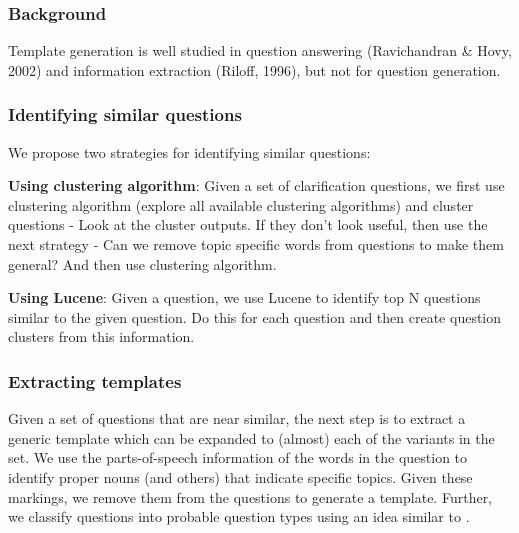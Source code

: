 \documentclass[11pt]{article}
\begin{document}
\subsubsection{Background}
 Template generation is well studied in question answering (Ravichandran \& Hovy, 2002) and information extraction (Riloff, 1996), but not for question generation.

\subsubsection{Identifying similar questions}

We propose two strategies for identifying similar questions:

\textbf{Using clustering algorithm}: Given a set of clarification questions, we first use clustering algorithm (explore all available clustering algorithms) and cluster questions - Look at the cluster outputs. If they don't look useful, then use the next strategy - Can we remove topic specific words from questions to make them general? And then use clustering algorithm.

\textbf{Using Lucene}: Given a question, we use Lucene to identify top N questions similar to the given question. Do this for each question and then create question clusters from this information.

\subsubsection{Extracting templates}

Given a set of questions that are near similar, the next step is to extract a generic template which can be expanded to (almost) each of the variants in the set. We use the parts-of-speech information of the words in the question to identify proper nouns (and others) that indicate specific topics. Given these markings, we remove them from the questions to generate a template. Further, we classify questions into probable question types using an idea similar to \cite{}.

\end{document}
